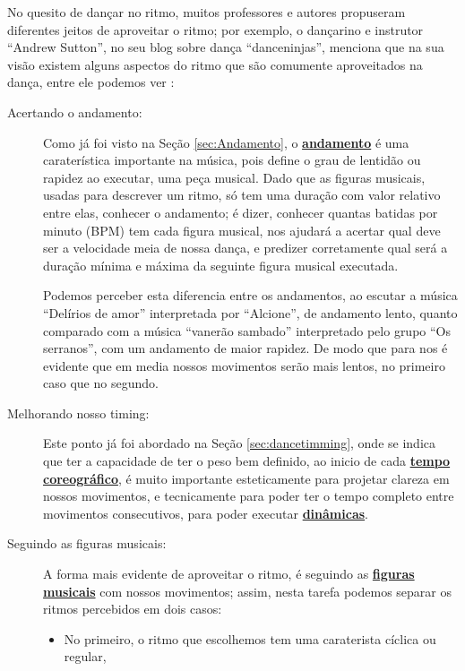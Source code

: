 No quesito de dançar no ritmo, muitos professores e autores propuseram diferentes jeitos de aproveitar o ritmo; 
por exemplo, o dançarino e instrutor ``Andrew Sutton'', 
no seu blog sobre dança ``danceninjas'',
menciona que na sua visão existem alguns aspectos do ritmo que são comumente aproveitados na dança,
entre ele podemos ver \cite{AndrewSuttonRitmo1}:  
\begin{description}
\item [Acertando o andamento:]%
Como já foi visto na Seção \ref{sec:Andamento},
o \hyperref[sec:Andamento]{\textbf{andamento}} é uma caraterística importante na música,
pois define o grau de lentidão ou rapidez ao executar,
uma peça musical. 
Dado que as figuras musicais, usadas para descrever um ritmo, 
só tem uma duração com valor relativo entre elas,
conhecer o andamento; é dizer, conhecer quantas batidas por minuto (BPM) tem cada figura musical,
nos ajudará a acertar qual deve ser a velocidade meia de nossa dança,
e predizer corretamente qual será a duração mínima e máxima da seguinte figura musical executada.
\begin{example}
Podemos perceber esta diferencia entre os andamentos, 
ao escutar a música ``Delírios de amor'' interpretada por ``Alcione'', 
de andamento lento, 
quanto comparado com a música ``vanerão sambado'' interpretado pelo grupo ``Os serranos'', 
com um andamento de maior rapidez.
De modo que para nos é evidente que em media nossos movimentos serão mais lentos,
no primeiro caso que no segundo.
\end{example}
\item [Melhorando nosso timing:]
Este ponto já foi abordado na Seção \ref{sec:dancetimming},
onde se indica que ter a capacidade de ter o peso bem definido,
ao inicio de cada \hyperref[sec:TemposCoreograficos]{\textbf{tempo coreográfico}}, 
é muito importante esteticamente para projetar clareza em nossos movimentos,
e tecnicamente para poder ter o tempo completo entre movimentos consecutivos,
para poder executar \hyperref[sec:musicalidade:dinamicas]{\textbf{dinâmicas}}.
\item [Seguindo as figuras musicais:]
A forma mais evidente de aproveitar o ritmo, 
é seguindo as \hyperref[sec:figurasmusicais]{\textbf{figuras musicais}} com nossos movimentos;
assim, nesta tarefa podemos separar os ritmos percebidos em dois casos:
\begin{itemize} 
\item No primeiro, o ritmo que escolhemos tem uma caraterista cíclica ou regular,

\end{itemize}
\end{description}
